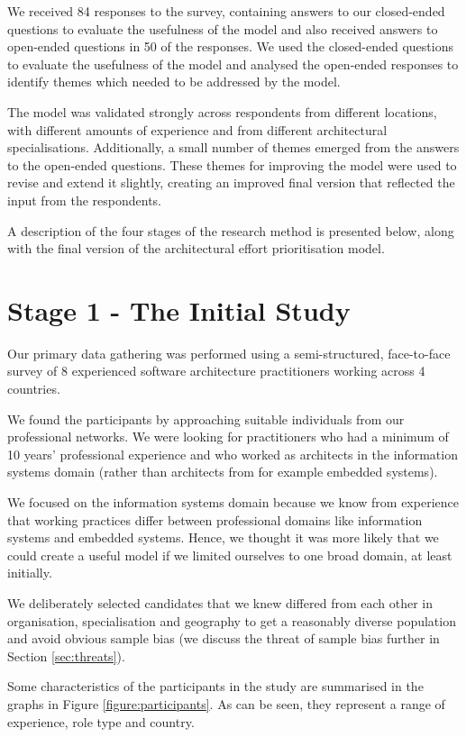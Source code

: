 We received 84 responses to the survey, containing answers to our closed-ended questions to evaluate the usefulness of the model and also received answers to open-ended questions in 50 of the responses.  We used the closed-ended questions to evaluate the usefulness of the model and analysed the open-ended responses to identify themes which needed to be addressed by the model.

The model was validated strongly across respondents from different locations, with different amounts of experience and from different architectural specialisations. Additionally, a small number of themes emerged from the answers to the open-ended questions.  These themes for improving the model were used to revise and extend it slightly, creating an improved final version that reflected the input from the respondents.

A description of the four stages of the research method is presented below, along with the final version of the architectural effort prioritisation model.

\section{Stage 1 - The Initial Study}

Our primary data gathering was performed using a semi-structured, face-to-face survey of 8 experienced software architecture practitioners working across 4 countries.

We found the participants by approaching suitable individuals from our professional networks.  We were looking for practitioners who had a minimum of 10 years' professional experience and who worked as architects in the information systems domain (rather than architects from \textendash for example \textendash embedded systems).  

We focused on the information systems domain because we know from experience that working practices differ between professional domains like information systems and embedded systems.  Hence, we thought it was more likely that we could create a useful model if we limited ourselves to one broad domain, at least initially. 

We deliberately selected candidates that we knew differed from each other in organisation, specialisation and geography to get a reasonably diverse population and avoid obvious sample bias (we discuss the threat of sample bias further in Section \ref{sec:threats}).

Some characteristics of the participants in the study are summarised in the graphs in Figure \ref{figure:participants}.  As can be seen, they represent a range of experience, role type and country.

